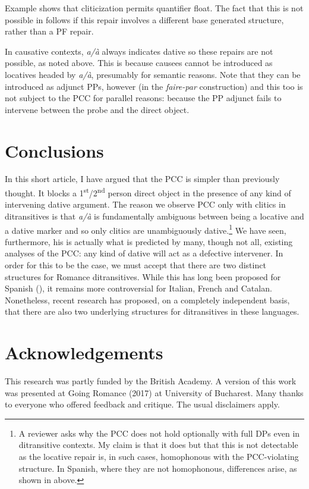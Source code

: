 \documentclass[output=paper,colorlinks,citecolor=brown,nonflat]{langsci/langscibook}
\begin{document}
Example  shows that cliticization permits quantifier float. The fact that this is not possible in  follows if this repair involves a different base generated structure, rather than a PF repair.

In causative contexts, \textit{a/à} always indicates dative so these repairs are not possible, as noted above. This is because causees cannot be introduced as locatives headed by \textit{a/à}, presumably for semantic reasons. Note that they can be introduced as adjunct PPs, however (in the \textit{faire-par} construction) and this too is not subject to the PCC for parallel reasons: because the PP adjunct fails to intervene between the probe and the direct object.

\section{Conclusions}\label{sec:sheehan:6}

In this short article, I have argued that the PCC is simpler than previously thought. It blocks a 1\textsuperscript{st}/2\textsuperscript{nd} person direct object in the presence of any kind of intervening dative argument. The reason we observe PCC only with clitics in ditransitives is that \textit{a/à} is fundamentally ambiguous between being a locative and a dative marker and so only clitics are unambiguously dative.\footnote{A reviewer asks why the PCC does not hold optionally with full DPs even in ditransitive contexts. My claim is that it does but that this is not detectable as the locative repair is, in such cases, homophonous with the PCC-violating structure. In Spanish, where they are not homophonous, differences arise, as shown in  above.} We have seen, furthermore, his is actually what is predicted by many, though not all, existing analyses of the PCC: any kind of dative will act as a defective intervener. In order for this to be the case, we must accept that there are two distinct structures for Romance ditransitives. While this has long been proposed for Spanish (\citealt{Demonte1995, Cuervo2003}), it remains more controversial for Italian, French and Catalan. Nonetheless, recent research has proposed, on a completely independent basis, that there are also two underlying structures for ditransitives in these languages.

\section*{Acknowledgements}

This research was partly funded by the British Academy. A version of this work was presented at Going Romance (2017) at University of Bucharest. Many thanks to everyone who offered feedback and critique. The usual disclaimers apply.

\sloppy\printbibliography[heading=subbibliography,notkeyword=this]
\end{document}
